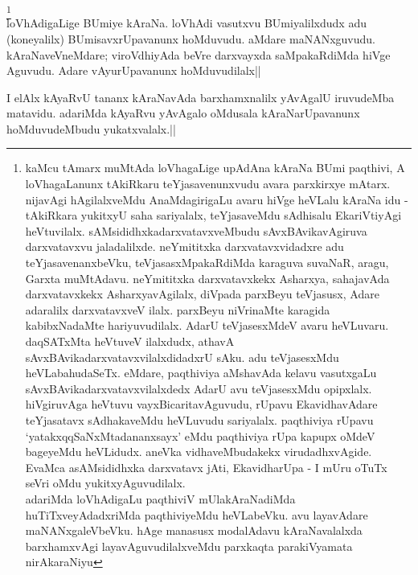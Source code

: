 
\begin{artha} 
\footnote[2]{kaMcu tAmarx muMtAda loVhagaLige upAdAna kAraNa BUmi 
paqthivi, A loVhagaLanunx tAkiRkaru teYjasavenunxvudu avara parxkirxye 
mAtarx. nijavAgi hAgilalxveMdu AnaMdagirigaLu avaru hiVge heVLalu 
kAraNa idu - tAkiRkara yukitxyU saha sariyalalx, teYjasaveMdu 
sAdhisalu EkariVtiyAgi heVtuvilalx. sAMsididhxkadarxvatavxveMbudu 
sAvxBAvikavAgiruva darxvatavxvu jaladalilxde. neYmititxka 
darxvatavxvidadxre adu teYjasavenanxbeVku, teVjasasxMpakaRdiMda 
karaguva suvaNaR, aragu, Garxta muMtAdavu. neYmititxka darxvatavxkekx 
Asharxya, sahajavAda darxvatavxkekx AsharxyavAgilalx, diVpada parxBeyu 
teVjasusx, Adare adaralilx darxvatavxveV ilalx. parxBeyu niVrinaMte 
karagida kabibxNadaMte hariyuvudilalx. AdarU teVjasesxMdeV avaru 
heVLuvaru. daqSATxMta heVtuveV ilalxdudx, athavA 
sAvxBAvikadarxvatavxvilalxdidadxrU sAku. adu teVjasesxMdu 
heVLabahudaSeTx. eMdare, paqthiviya aMshavAda kelavu vasutxgaLu 
sAvxBAvikadarxvatavxvilalxdedx AdarU avu teVjasesxMdu opipxlalx. 
hiVgiruvAga heVtuvu vayxBicaritavAguvudu, rUpavu EkavidhavAdare 
teYjasatavx sAdhakaveMdu heVLuvudu sariyalalx. paqthiviya rUpavu 
`yatakxqqSaNxMtadananxsayx' eMdu paqthiviya rUpa kapupx oMdeV 
bageyeMdu heVLidudx. aneVka vidhaveMbudakekx virudadhxvAgide. EvaMca 
asAMsididhxka darxvatavx jAti, EkavidharUpa - I mUru oTuTx seVri oMdu 
yukitxyAguvudilalx.\\ 
adariMda loVhAdigaLu paqthiviV mUlakAraNadiMda huTiTxveyAdadxriMda 
paqthiviyeMdu heVLabeVku. avu layavAdare maNANxgaleVbeVku. hAge 
manasusx modalAdavu kAraNavalalxda barxhamxvAgi layavAguvudilalxveMdu 
parxkaqta parakiVyamata nirAkaraNiyu}\\
loVhAdigaLige BUmiye kAraNa. loVhAdi vasutxvu BUmiyalilxdudx adu 
(koneyalilx) BUmisavxrUpavanunx hoMduvudu. aMdare maNANxguvudu. 
kAraNaveVneMdare; viroVdhiyAda beVre darxvayxda saMpakaRdiMda hiVge 
Aguvudu. Adare vAyurUpavanunx hoMduvudilalx||
\end{artha}


\begin{artha} 
I elAlx kAyaRvU tananx kAraNavAda barxhamxnalilx yAvAgalU iruvudeMba 
matavidu. adariMda kAyaRvu yAvAgalo oMdusala kAraNarUpavanunx 
hoMduvudeMbudu yukatxvalalx.||
\end{artha}


